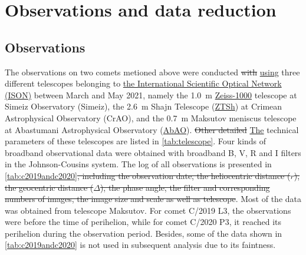\section{Observations and data reduction} \label{sec:obs_data}

\subsection{Observations}

\begin{comment}
C/2019 L3与C/2020 P3

观测波段：BVR

望远镜：094，095，119
\end{comment}

The observations on two comets metioned above were conducted \st{with} \ul{using} three different telescopes belonging to \ul{the International Scientific Optical Network (ISON)} between March and May 2021, namely the {\SI{1.0}{\m}} {\href{https://link.springer.com/content/pdf/10.1134/S1990341320040112.pdf}{Zeiss-1000}} telescope at Simeiz Observatory (Simeiz), the {\SI{2.6}{\m}} Shajn Telescope ({\href{https://crao.ru/index.php/en/telescopes-en/ztsh-en}{ZTSh}}) at Crimean Astrophysical Observatory (CrAO), and the {\SI{0.7}{\m}} Maksutov meniscus telescope at Abastumani Astrophysical Observatory ({\href{https://www.oato.inaf.it/blazars/webt/abastumani-astrophysical-observatory-georgia-fsu/}{AbAO}}). \st{Other detailed} \ul{The} technical parameters of these telescopes are listed in \autoref{tab:telescope}. Four kinds of broadband observational data were obtained with broadband B, V, R and I filters in the Johnson-Cousins system. The log of all observations is presented in \autoref{tab:c2019andc2020}\st{, including the observation date, the heliocentric distance ($r$), the geocentric distance ($\Delta$), the phase angle, the filter and corresponding numbers of images, the image size and scale as well as telescope}. Most of the data was obtained from telescope Maksutov. For comet C/2019 L3, the observations were before the time of perihelion, while for comet C/2020 P3, it reached its perihelion during the observation period. Besides, some of the data shown in \autoref{tab:c2019andc2020} is not used in subsequent analysis due to its faintness. 

\begin{comment}
两颗彗星的观测数据来源于4种不同的望远镜，其中一种未在头文件中标识，大部分观测数据来源于`AC-32, 700/1000 Maksutov, AbAO'，此望远镜所在的天文台MPC编号为119。观测时间均在2021年3月至5月之间，主要观测波段为BVR。有关望远镜的信息如表~\ref{tab:telescope}~所示，表~\ref{tab:c2019andc2020}~描述了彗星C/2019 L3和C/2020 P3的观测数据信息

观测模式是否为恒动？

所得观测图像都已经过暗流校正和平场校正，%
\end{comment}


